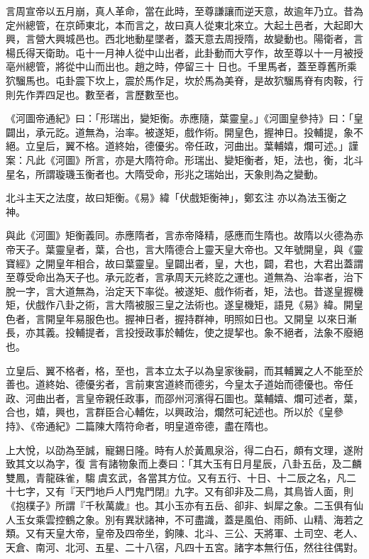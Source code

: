 \begin{pinyinscope}
 言周宣帝以五月崩，真人革命，當在此時，至尊謙讓而逆天意，故逾年乃立。昔為定州總管，在京師東北，本而言之，故曰真人從東北來立。大起土邑者，大起即大興，言營大興城邑也。西北地動星墜者，蓋天意去周授隋，故變動也。陽衛者，言楊氏得天衛助。屯十一月神人從中山出者，此卦動而大亨作，故至尊以十一月被授亳州總管，將從中山而出也。趙之時，停留三十
 日也。千里馬者，蓋至尊舊所乘狖騮馬也。屯卦震下坎上，震於馬作足，坎於馬為美脊，是故狖騮馬脊有肉鞍，行則先作弄四足也。數至者，言歷數至也。



 《河圖帝通紀》曰：「形瑞出，變矩衡。赤應隨，葉靈皇。」《河圖皇參持》曰：「皇闢出，承元訖。道無為，治率。被遂矩，戲作術。開皇色，握神日。投輔提，象不絕。立皇后，翼不格。道終始，德優劣。帝任政，河曲出。葉輔嬉，爛可述。」謹案：凡此《河圖》所言，亦是大隋符命。形瑞出、變矩衡者，矩，法也，衡，北斗星名，所謂璇璣玉衡者也。大隋受命，形兆之瑞始出，天象則為之變動。



 北斗主天之法度，故曰矩衡。《易》緯「伏戲矩衡神」，鄭玄注
 亦以為法玉衡之神。



 與此《河圖》矩衡義同。赤應隋者，言赤帝降精，感應而生隋也。故隋以火德為赤帝天子。葉靈皇者，葉，合也，言大隋德合上靈天皇大帝也。又年號開皇，與《靈寶經》之開皇年相合，故曰葉靈皇。皇闢出者，皇，大也，闢，君也，大君出蓋謂至尊受命出為天子也。承元訖者，言承周天元終訖之運也。道無為、治率者，治下脫一字，言大道無為，治定天下率從。被遂矩、戲作術者，矩，法也。昔遂皇握機矩，伏戲作八卦之術，言大隋被服三皇之法術也。遂皇機矩，語見《易》緯。開皇色者，言開皇年易服色也。握神日者，握持群神，明照如日也。又開皇
 以來日漸長，亦其義。投輔提者，言投授政事於輔佐，使之提挈也。象不絕者，法象不廢絕也。



 立皇后、翼不格者，格，至也，言本立太子以為皇家後嗣，而其輔翼之人不能至於善也。道終始、德優劣者，言前東宮道終而德劣，今皇太子道始而德優也。帝任政、河曲出者，言皇帝親任政事，而邵州河濱得石圖也。葉輔嬉、爛可述者，葉，合也，嬉，興也，言群臣合心輔佐，以興政治，爛然可紀述也。所以於《皇參持》、《帝通紀》二篇陳大隋符命者，明皇道帝德，盡在隋也。



 上大悅，以劭為至誠，寵錫日隆。時有人於黃鳳泉浴，得二白石，頗有文理，遂附致其文以為字，復
 言有諸物象而上奏曰：「其大玉有日月星辰，八卦五岳，及二麟雙鳳，青龍硃雀，騶虞玄武，各當其方位。又有五行、十日、十二辰之名，凡二十七字，又有『天門地戶人門鬼門閉』九字。又有卻非及二鳥，其鳥皆人面，則《抱樸子》所謂『千秋萬歲』也。其小玉亦有五岳、卻非、虯犀之象。二玉俱有仙人玉女乘雲控鶴之象。別有異狀諸神，不可盡識，蓋是風伯、雨師、山精、海若之類。又有天皇大帝，皇帝及四帝坐，鉤陳、北斗、三公、天將軍、土司空、老人、天倉、南河、北河、五星、二十八宿，凡四十五宮。諸字本無行伍，然往往偶對。




\end{pinyinscope}
